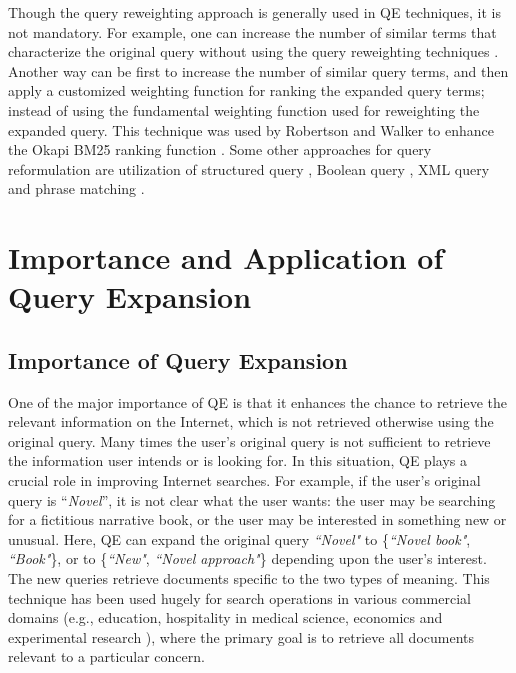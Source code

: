 Though the query reweighting approach is generally used in QE techniques, it is not mandatory. For example, one can increase the number of similar terms that characterize the original query without using the query reweighting techniques \cite{carpineto2012survey}. Another way can be first to increase the number of similar query terms, and then apply a customized weighting function for ranking the expanded query terms; instead of using the fundamental weighting function used for reweighting the expanded query. This technique was used by Robertson and Walker \cite{robertson2000microsoft} to enhance the Okapi BM25 ranking function \cite{robertson1999okapi}. Some other approaches for query reformulation are utilization of structured query \cite{collins2005query,pound2010expressive,kato2012structured,jamil2015structured}, Boolean query \cite{pane2000improving,liu2004effective,graupmann2005automatic,kim2011automatic}, XML query \cite{kamps2006articulating,chu2006semantic,junedi2012xml} and phrase matching \cite{arguello2008document}.
\section{Importance and Application of Query Expansion}\label{sec3} 
\subsection{Importance of Query Expansion}
One of the major importance of QE is that it enhances the chance to retrieve the relevant information on the Internet, which is not retrieved otherwise using the original query.  Many times the user's original query is not sufficient to retrieve the information user intends or is looking for. In this situation,  QE plays a crucial role in improving Internet searches. For example, if the user's original query is ``\emph{Novel}'', it is not clear what the user wants: the user may be searching for a fictitious narrative book, or the user may be interested in something new or unusual. Here, QE can expand the original query \emph{``Novel"} to \{\emph{``Novel book"}, \emph{``Book"}\}, or to \{\emph{``New"}, \emph{``Novel approach"}\} depending upon the user's interest. The new queries retrieve documents specific to the two types of meaning. This technique has been used hugely for search operations in various commercial domains (e.g., education, hospitality in medical science, economics and experimental research \cite{carpineto2012survey}), where the primary goal is to retrieve all  documents relevant to a particular concern. 

